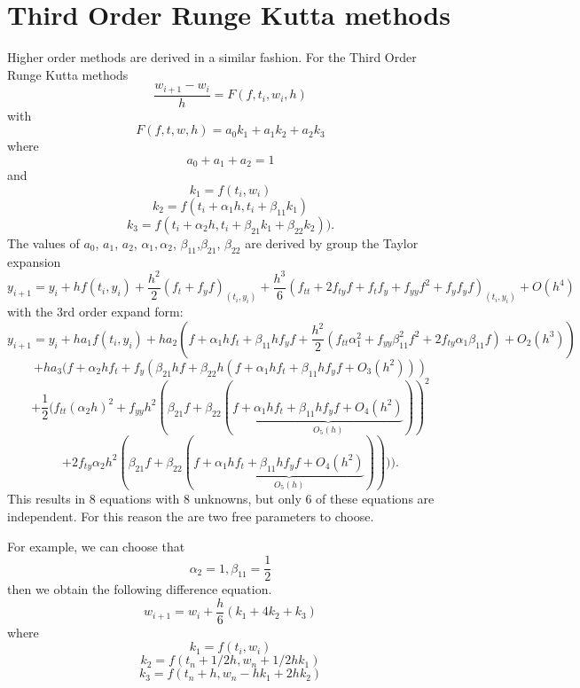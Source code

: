 \section{Third Order Runge Kutta methods}
Higher order methods are derived in a similar fashion.
For the Third Order Runge Kutta methods 
\begin{equation}
\frac{w_{i+1}-w_i}{h}=F(f,t_i,w_i,h)
\end{equation}
with
\begin{equation}
F(f,t,w,h)=a_0k_1+a_1k_2+a_2k_3
\end{equation}
where 
\[a_0+a_1+a_2=1\] 
and
\[k_1=f(t_i,w_i)\]
\[k_2=f(t_i+\alpha_1h,t_i+\beta_{11}k_1)\]
\[k_3=f(t_i+\alpha_2h,t_i+\beta_{21}k_1+\beta_{22}k_2)).\]
The values of $a_0$, $a_1$, $a_2$, $\alpha_1,\alpha_2$, $\beta_{11}$,$\beta_{21}$, $\beta_{22}$ are derived by group the Taylor expansion
\[ y_{i+1}=y_{i}+hf(t_{i},y_{i})+{\frac {h^{2}}{2}}(f_{t}+f_{y}f)_{(t_{i},y_{i})}+{\frac {h^{3}}{6}}\left(f_{tt}+2f_{ty}f+f_{t}f_{y}+f_{yy}f^{2}+f_{y}f_{y}f\right)_{(t_{i},y_{i})}+O(h^{4})\]
with the 3rd order expand form:
\[ y_{i+1}=y_{i}+ha_{1}f(t_{i},y_{i})+ha_{2}(f+\alpha_{1}hf_{t}+\beta_{11}hf_{y}f+{\frac {h^{2}}{2}}(f_{tt}\alpha_{1}^{2}+f_{yy}\beta_{11}^{2}f^{2}+2f_{ty}\alpha_{1}\beta_{11}f)+O_{2}(h^{3}))\]
\[+ha_{3}(f+\alpha_{2}hf_{t}+f_{y}\left(\beta_{21}hf+\beta_{22}h(f+\alpha_{1}hf_{t}+\beta_{11}hf_{y}f+O_{3}(h^{2}))\right)\] 
\[+{\frac {1}{2}}(f_{tt}(\alpha_{2}h)^{2}+f_{yy}h^{2}(\beta_{21}f+ \beta_{22}(f+\underbrace {\alpha_{1}hf_{t}+\beta_{11}hf_{y}f+O_{4}(h^{2})} _{O_{5}(h)}))^{2}\]
 \[+2f_{ty}\alpha_{2}h^{2}(\beta_{21}f+\beta_{22}(f+\underbrace {\alpha_{1}hf_{t}+\beta_{11}hf_{y}f+O_{4}(h^{2})} _{O_{5}(h)})))).\]
 This results in 8 equations with 8 unknowns, but only 6 of these equations are independent. For this reason the are two free parameters to choose.

For example, we can choose that \[\alpha_{2}=1,\beta_{11}=\frac{1}{2}\]then we obtain the following difference equation.
\[ w_{i+1}=w_{i}+{\frac {h}{6}}(k_{1}+4k_{2}+k_{3})\]
where
\[k_{1}=f(t_{i},w_{i})\]
\[ k_{2}=f(t_{n}+1/2h,w_{n}+1/2hk_{1})\]
\[ k_{3}=f(t_{n}+h,w_{n}-hk_{1}+2hk_{2})\]

